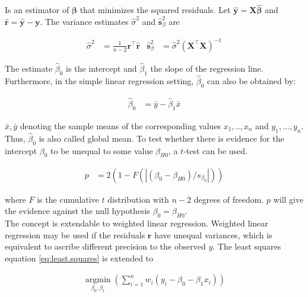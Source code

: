 \documentclass[11pt,a4paper,twoside]{book}\usepackage[]{graphicx}\usepackage[]{color}
\begin{document}
Is an estimator of $\mathbf{\beta}$ that minimizes the squared residuals. Let $\hat{\mathbf{y}} = \mathbf{X}\hat{\mathbf{\beta}}$ and $\hat{\mathbf{r}} = \hat{\mathbf{y}} - \mathbf{y}$. The variance estimates $\hat{\sigma}^2$ and $\hat{\mathbf{s}}_\beta^2$ are

\begin{align}
\hat{\sigma}^2 &= \frac{1}{n-2}\mathbf{r}^\top \hat{\mathbf{r}} & \hat{\mathbf{s}}_\beta^2 &= \hat{\sigma}^2 (\mathbf{X}^\top \mathbf{X})^{-1} \label{eq:regression.variances}
\end{align}

The estimate $\hat{\beta}_0$ is the intercept and $\hat{\beta}_1$ the slope of the regression line. Furthermore, in the simple linear regression setting, $\hat{\beta}_0$ can also be obtained by:

\begin{align}
\hat{\beta}_0 &= \bar{y} - \hat{\beta}_1 \bar{x} \nonumber
\end{align}

$\bar{x}, \bar{y}$ denoting the sample means of the corresponding values $x_1, .., x_n$ and $y_1, ..., y_n$. Thus, $\hat{\beta}_0$ is also called global mean.
To test whether there is evidence for the intercept $\beta_0$ to be unequal to some value $\beta_{H0}$, a $t$-test can be used. 

\begin{align}
p &= 2(1-F(|(\beta_0 - \beta_{H0})/s_{\beta_0}|)) \nonumber
\end{align}

where $F$ is the cumulative $t$ distribution with $n-2$ degrees of freedom. $p$ will give the evidence against the null hypothesis $\beta_0 = \beta_{H0}$. \\
The concept is extendable to weighted linear regression. Weighted linear regression may be used if the residuals $\mathbf{r}$ have unequal variances, which is equivalent to ascribe different precision to the observed $y$. The least squares equation \ref{eq:least.squares} is extended to

\begin{align}
\operatorname*{argmin}_{\beta_0, \beta_1}(\sum_{i = 1}^n w_i(y_i - \beta_0 - \beta_1 x_i)) \nonumber
\end{align}
\end{document}

